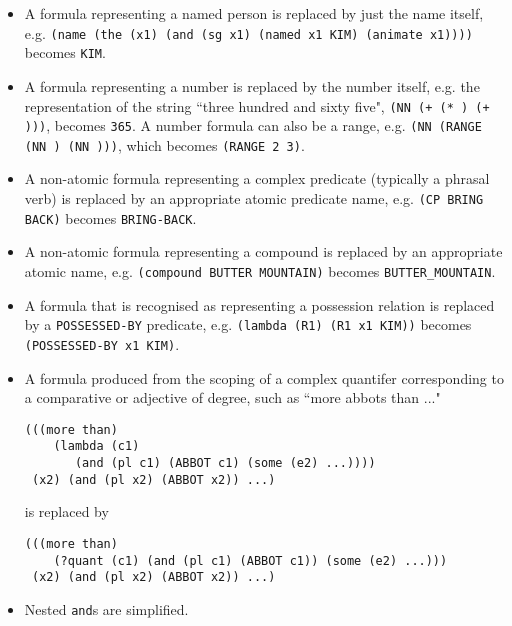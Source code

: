 \begin{itemize}
\item A formula representing a named person is replaced by just the name
itself, e.g. {\tt (name (the (x1) (and (sg x1) (named x1 KIM) (animate x1))))}
becomes {\tt KIM}.

\item A formula representing a number is replaced by the number itself, e.g.
the representation of the string ``three hundred and sixty five",
{\tt (NN (+ (*  ) (+  )))}, becomes {\tt 365}. A
number formula can also be a range, e.g. {\tt (NN (RANGE (NN )
(NN )))}, which becomes {\tt (RANGE 2 3)}.

\item A non-atomic formula representing a complex predicate (typically
a phrasal verb) is replaced by an appropriate atomic predicate name, e.g.
{\tt (CP BRING BACK)} becomes {\tt BRING-BACK}.

\item A non-atomic formula representing a compound is replaced by
an appropriate atomic name, e.g. {\tt (compound BUTTER MOUNTAIN)} becomes
{\tt BUTTER\_MOUNTAIN}.

\item A formula that is recognised as representing a possession relation is
replaced by a {\tt POSSESSED-BY} predicate, e.g. {\tt (lambda (R1) (R1 x1 KIM))}
becomes {\tt (POSSESSED-BY x1 KIM)}.

\item A formula produced from the scoping of a complex quantifer corresponding
to a comparative or adjective of degree, such as ``more abbots than ..."
\begin{ex}
\begin{verbatim}
(((more than)
    (lambda (c1)
       (and (pl c1) (ABBOT c1) (some (e2) ...))))
 (x2) (and (pl x2) (ABBOT x2)) ...)
\end{verbatim}
\end{ex}
is replaced by
\begin{ex}
\begin{verbatim}
(((more than)
    (?quant (c1) (and (pl c1) (ABBOT c1)) (some (e2) ...)))
 (x2) (and (pl x2) (ABBOT x2)) ...)
\end{verbatim}
\end{ex}

\item Nested {\tt and}s are simplified.
\end{itemize}


